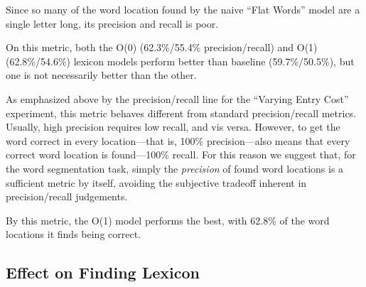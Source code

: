 \documentclass[11pt, oneside, fleqn]{article}
\begin{document}
	Since so many of the word location found by the naive ``Flat Words'' model are a single letter long, its precision and recall is poor.

	On this metric, both the O(0) (62.3\%/55.4\% precision/recall) and O(1) (62.8\%/54.6\%) lexicon models perform better than baseline (59.7\%/50.5\%), but one is not necessarily better than the other.

	As emphasized above by the precision/recall line for the ``Varying Entry Cost'' experiment, this metric behaves different from standard precision/recall metrics. Usually, high precision requires low recall, and vis versa. However, to get the word correct in every location---that is, 100\% precision---also means that every correct word location is found---100\% recall. For this reason we suggest that, for the word segmentation task, simply the \textit{precision} of found word locations is a sufficient metric by itself, avoiding the subjective tradeoff inherent in precision/recall judgements.
	
	By this metric, the O(1) model performs the best, with 62.8\% of the word locations it finds being correct.

  \subsection{Effect on Finding Lexicon}
\end{document}
